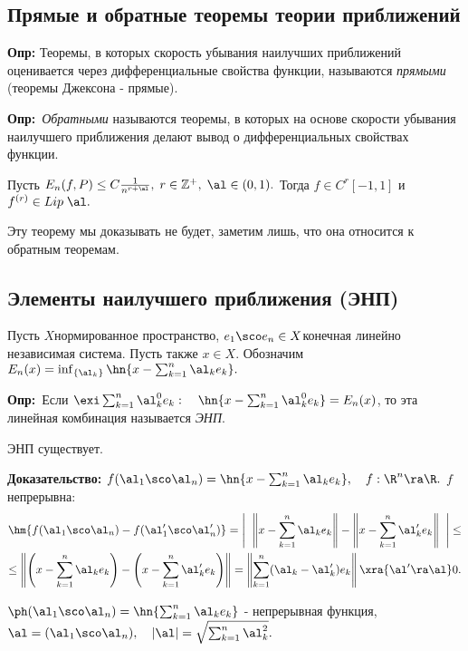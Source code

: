 \documentclass[a4paper]{article}
\def\defin{\noindent\textbf{Опр:}\ }
\begin{document}
\subsection{Прямые и обратные теоремы теории приближений}
\textbf{Опр:} Теоремы, в которых скорость убывания наилучших приближений оценивается через дифференциальные
свойства функции, называются \emph{прямыми} (теоремы Джексона - прямые).

\defin \emph{Обратными} называются теоремы, в
которых на основе скорости убывания наилучшего приближения делают
вывод о дифференциальных свойствах функции.

\begin{theorems}[Бернштейн] Пусть $E_n(f,P)\le C
\frac1{n^{r+\al}},\; r\in\mathbb{Z}^{+},\;\al\in(0,1).$
Тогда $f\in C^r[-1,1]$ и \\\hangindent=5cm$f^{(r)}\in
Lip\;\al.$
\end{theorems}
Эту теорему мы доказывать не будет, заметим лишь, что она
относится к обратным теоремам.

\subsection{Элементы наилучшего приближения (ЭНП)}

Пусть $X$\т нормированное пространство, $e_1\sco e_n\in X$\т конечная линейно независимая система. Пусть также $x\in X$.
Обозначим $E_n(x)=\inf_{\{\al_k\}}\hn{x-\sum_{k=1}^n \al_k e_k}.$

\medskip\defin Если $\exi\sum_{k=1}^n \al_k^0
e_k:\quad\hn{x-\sum_{k=1}^n \al_k^0 e_k}=E_n(x)$, то эта
линейная комбинация называется \emph{ЭНП}.
\begin{theorems}
ЭНП существует.
\end{theorems}
\textbf{Доказательство:}
$f(\al_1\sco \al_n)=\hn{x-\sum_{k=1}^n \al_k e_k},\quad
f:\R ^n\ra \R .$ $f$ непрерывна:
\begin{multline*}
\hm{f(\al_1\sco \al_n)-f(\al_1'\sco \al_n')}=\left|\;\;\left\|x-\sum_{k=1}^n
\al_k e_k\right\|-\left\|x-\sum_{k=1}^n \al_k'
e_k\right\|\;\;\right|\le\\
\le\left\|\left(x-\sum_{k=1}^n \al_k
e_k\right)-\left(x-\sum_{k=1}^n \al_k'
e_k\right)\right\|=\left\|\sum_{k=1}^n (\al_k-\al_k')
e_k\right\|\xra{\al'\ra\al}0.
\end{multline*}

$\ph(\al_1\sco \al_n)=\hn{\sum_{k=1}^n \al_k e_k}$
 - непрерывная функция, $\al=(\al_1\sco \al_n),\quad|\al|=\sqrt{\sum_{k=1}^n\al_k^2}.$
\end{document}
